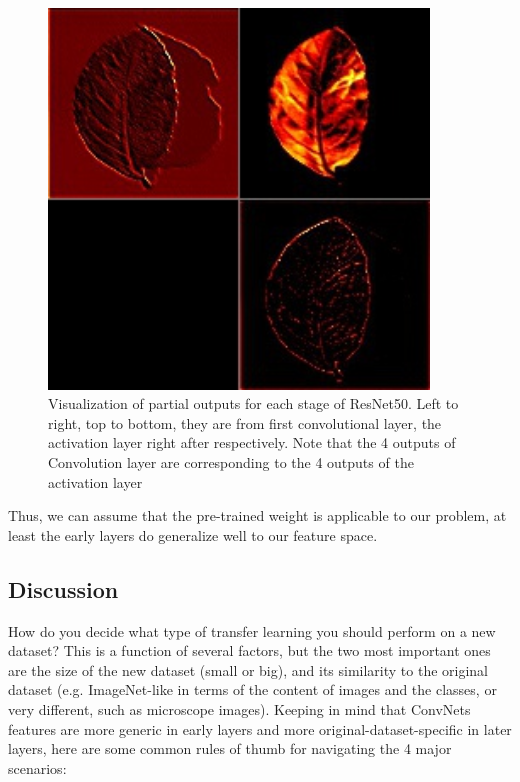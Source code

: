 \documentclass[journal, 10pt]{IEEEtran}
\begin{document}
\begin{figure}[H]
\begin{minipage}[b]{0.3\linewidth}
      \includegraphics[width=0.9\textwidth]{33214-a1.jpg}
      \vspace{4ex}
    \end{minipage}
    \caption{Visualization of partial outputs for each stage of ResNet50. Left to right, top to bottom, they are from first convolutional layer, the activation layer right after respectively. Note that the 4 outputs of Convolution layer are corresponding to the 4 outputs of the activation layer}
    \label{fig:visual_output}
  \end{figure}

  Thus, we can assume that the pre-trained weight is applicable to our problem, at least the early layers do generalize well to our feature space.

  \subsection{Discussion}
    How do you decide what type of transfer learning you should perform on a new dataset? This is a function of several factors, but the two most important ones are the size of the new dataset (small or big), and its similarity to the original dataset (e.g. ImageNet-like in terms of the content of images and the classes, or very different, such as microscope images). Keeping in mind that ConvNets features are more generic in early layers and more original-dataset-specific in later layers, here are some common rules of thumb for navigating the 4 major scenarios:
    \cite{CS231N}
\end{document}
